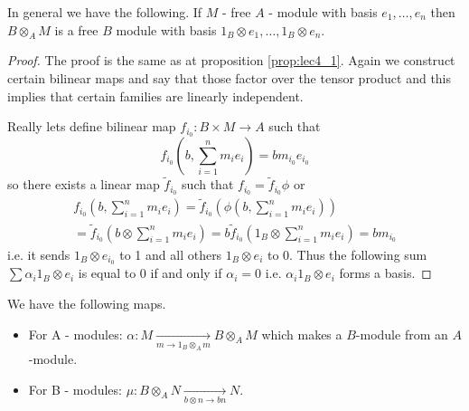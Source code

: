 \begin{proposition}
In general we have the following. If $M$ - free $A$ - module with
basis $e_1, \dots, e_n$ then $B \otimes_A M$ is a free $B$ module with
basis $1_B \otimes e_1, \dots, 1_B \otimes e_n$.
\begin{proof}
  The proof is the same as at proposition \ref{prop:lec4_1}. Again we
  construct certain bilinear maps and say that those factor over the
  tensor product and this implies that certain families are linearly
  independent.

  Really lets define bilinear map $f_{i_0}: B \times M \to A$ such that
  \[
  f_{i_0}\left(b, \sum_{i=1}^n m_i e_i\right) = b m_{i_0} e_{i_0}
  \]
  so there exists a linear map $\tilde{f}_{i_0}$ such that
  $f_{i_0} = \tilde{f}_{i_0} \phi$ or
  \begin{eqnarray}
    f_{i_0}\left(b, \sum_{i=1}^n m_i e_i\right) =
    \tilde{f}_{i_0} \left(
    \phi\left(b, \sum_{i=1}^n m_i e_i\right)
    \right)
    \nonumber \\
    =
    \tilde{f}_{i_0}\left(b \otimes \sum_{i=1}^n m_i e_i\right) =
    b \tilde{f}_{i_0}\left(1_B \otimes \sum_{i=1}^n m_i e_i \right) =
    b m_{i_0}
    \nonumber
  \end{eqnarray}
  i.e. it sends $1_B \otimes e_{i_0}$ to 1 and all others $1_B \otimes
  e_i$ to 0.
  Thus the following sum $\sum \alpha_i 1_B \otimes e_i$ is equal to 0
  if and only if $\alpha_i = 0$ i.e. $\alpha_i 1_B \otimes e_i$ forms a basis.
\end{proof}
\label{prop:lec4_Addon}
\end{proposition}

\begin{remark}
We have the following maps.
\begin{itemize}
  \label{item:lec4_maps}
\item For A - modules:
  $\alpha: M \xrightarrow[m  \to 1_B \otimes_A m]{} B \otimes_A M$
  which makes a $B$-module from an $A$-module.
\item For B - modules:
  $\mu: B \otimes_A N \xrightarrow[b \otimes n \to b n]{} N$.
\end{itemize}
\label{rem:lec4_maps}
\end{remark}

